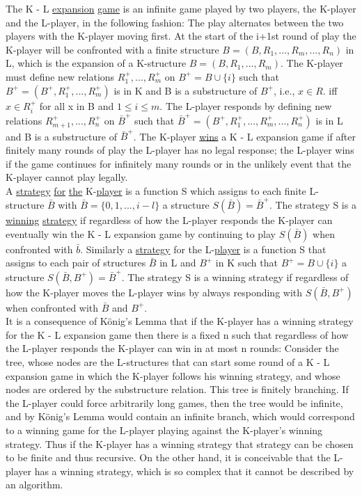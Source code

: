 \documentclass[twoside]{article}
\begin{document}
The   K - L   \underline{expansion} \underline{game} is an infinite game played by two players, the K-player and the   L-player,  in the following fashion:    The play alternates between the two players with the   K-player moving first. 
At the start of the i+1st round of play    the K-player will be confronted with a finite structure $B = (B, R_1,...,R_m,...,R_n)$    in   L, which is the expansion of a K-structure $B = (B,R_1,..., R_m)$.    
The   K-player must define new relations $R_1^{+},...,R_m^+$     on $B^+ = B \cup \{i\}$   such that   $B^+ = (B^+, R_1^+,...,R_m^+)$ is in   K   and   B   is a substructure of $B^+$, i.e., $x\in R$. iff $x\in R_i^+$ for all x in B and $1 \leq i \leq m$. 
The L-player responds by defining new relations   $R_{m+1}^+,...,R_n^+$ on   $\bar{B}^+$   such that   $\bar{B}^+ = (B^+,R_1^+,...,R_m^+,...,R_n^+)$    is   in   L   and   B is a substructure of   $\bar{B}^+$.   
The K-player \underline{wins} a   K - L   expansion game if after finitely many rounds of play the L-player has no legal response;  the L-player wins if the game continues for infinitely many rounds or in the unlikely event that the   K-player cannot play legally.\\
\indent A \underline{strategy} \underline{for} \underline{the}   K-\underline{player} is a function   S which assigns to each finite L-structure $\bar{B}$ with $\bar{B} = \{0,1,...,i-l\}$ a structure   $S(\bar{B}) = \bar{B}^+$. 
The strategy S is a \underline{winning} \underline{strategy} if regardless of how the   L-player responds the K-player can eventually win the   K - L   expansion game by continuing to play $S(\bar{B})$ when confronted with   $\bar{b}$.
Similarly a \underline{strategy} for the   L-\underline{player}   is a function   S   that assigns to each pair of structures  $\bar{B}$   in   L and   $B^+$   in K such that   $B^+ = B \cup \{i\}$   a structure   $S(\bar{B},B^+) = \bar{B}^+$.   The strategy   S   is a winning strategy if regardless of how the   K-player moves the L-player wins by always responding with   $S(\bar{B},B^+)$   when confronted with   $\bar{B}$   and $B^+$.\\
\indent It is a consequence of K\"{o}nig's Lemma   that if the   K-player has a
winning strategy for the   K - L   expansion game then there is a fixed   n such that regardless of how the   L-player responds the   K-player can win in at most n   rounds:   Consider the tree, whose nodes are the   L-structures that can start some round of a   K - L   expansion game in which the K-player follows his winning strategy, and whose nodes are ordered by the substructure relation.
This tree is finitely branching.    If the   L-player could force arbitrarily long games, then the tree would be infinite, and by K\"{o}nig's Lemma would contain an infinite branch, which would correspond to a winning game for the
\newpage
%
%
\noindent L-player playing against the   K-player's winning strategy.    
Thus if the K-player has a winning strategy that strategy can be chosen to be finite and thus recursive.    
On the other hand, it is conceivable that the L-player has a winning strategy, which is so complex that it cannot be described by an algorithm.
\end{document}
